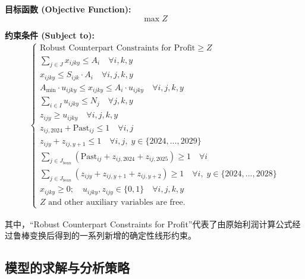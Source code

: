 \documentclass[withoutpreface,bwprint]{cumcmthesis} %
\begin{document}
\textbf{目标函数 (Objective Function):}
\begin{equation}
	\max Z
\end{equation}

\textbf{约束条件 (Subject to):}
\begin{align}
\left\{
\begin{array}{l}
     \text{Robust Counterpart Constraints for Profit} \ge Z                                                                  \\
     \sum_{j \in J} x_{ijky} \le A_i                                            \quad \forall i,k,y                           \\
     x_{ijky} \le S_{ijk} \cdot A_i                                             \quad \forall i,j,k,y                         \\
     A_{\min} \cdot u_{ijky} \le x_{ijky} \le A_i \cdot u_{ijky}                \quad \forall i,j,k,y                         \\
     \sum_{i \in I} u_{ijky} \le N_j                                            \quad \forall j,k,y                           \\
     z_{ijy} \ge u_{ijky}                                                       \quad \forall i,j,k,y                         \\
     z_{ij,2024} + \text{Past}_{ij} \le 1                                       \quad \forall i,j                             \\
     z_{ijy} + z_{ij,y+1} \le 1                                                 \quad \forall i,j, \; y \in \{2024,...,2029\} \\
     \sum_{j \in J_{bean}} (\text{Past}_{ij} + z_{ij,2024} + z_{ij,2025}) \ge 1 \quad \forall i                               \\
     \sum_{j \in J_{bean}} (z_{ijy} + z_{ij,y+1} + z_{ij,y+2}) \ge 1            \quad \forall i, \; y \in \{2024,...,2028\}   \\
     x_{ijky} \ge 0; \quad u_{ijky}, z_{ijy} \in \{0, 1\}                       \quad \forall i,j,k,y                         \\
     Z \text{ and other auxiliary variables are free.}
\end{array}
\right.
\end{align}

其中，“Robust Counterpart Constraints for Profit”代表了由原始利润计算公式经过鲁棒变换后得到的一系列新增的确定性线形约束。

\subsection{模型的求解与分析策略}
\end{document}

